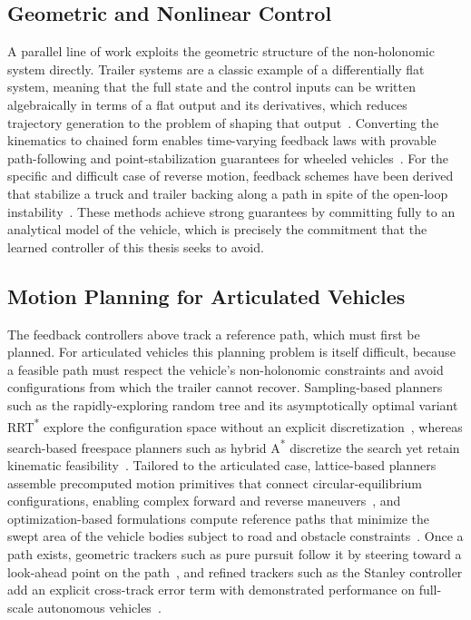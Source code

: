 \subsection{Geometric and Nonlinear Control}
A parallel line of work exploits the geometric structure of the non-holonomic system directly. Trailer systems are a classic example of a differentially flat system, meaning that the full state and the control inputs can be written algebraically in terms of a flat output and its derivatives, which reduces trajectory generation to the problem of shaping that output~\cite{fliess1995flatness}. Converting the kinematics to chained form enables time-varying feedback laws with provable path-following and point-stabilization guarantees for wheeled vehicles~\cite{samson1995chained}. For the specific and difficult case of reverse motion, feedback schemes have been derived that stabilize a truck and trailer backing along a path in spite of the open-loop instability~\cite{altafini2001reversing}. These methods achieve strong guarantees by committing fully to an analytical model of the vehicle, which is precisely the commitment that the learned controller of this thesis seeks to avoid.

\subsection{Motion Planning for Articulated Vehicles}
The feedback controllers above track a reference path, which must first be planned. For articulated vehicles this planning problem is itself difficult, because a feasible path must respect the vehicle's non-holonomic constraints and avoid configurations from which the trailer cannot recover. Sampling-based planners such as the rapidly-exploring random tree and its asymptotically optimal variant RRT\textsuperscript{*} explore the configuration space without an explicit discretization~\cite{karaman2011sampling, lavalle2006planning}, whereas search-based freespace planners such as hybrid A\textsuperscript{*} discretize the search yet retain kinematic feasibility~\cite{dolgov2010hybridastar}. Tailored to the articulated case, lattice-based planners assemble precomputed motion primitives that connect circular-equilibrium configurations, enabling complex forward and reverse maneuvers~\cite{ljungqvist2017lattice}, and optimization-based formulations compute reference paths that minimize the swept area of the vehicle bodies subject to road and obstacle constraints~\cite{oliveira2020optimization}. Once a path exists, geometric trackers such as pure pursuit follow it by steering toward a look-ahead point on the path~\cite{coulter1992pure}, and refined trackers such as the Stanley controller add an explicit cross-track error term with demonstrated performance on full-scale autonomous vehicles~\cite{hoffmann2007autonomous}.

